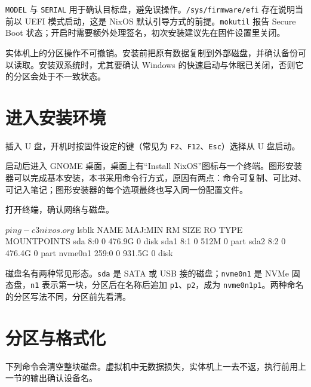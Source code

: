 \texttt{MODEL} 与 \texttt{SERIAL} 用于确认目标盘，避免误操作。\texttt{/sys/firmware/efi} 存在说明当前以 UEFI 模式启动，这是 NixOS 默认引导方式的前提。\texttt{mokutil} 报告 Secure Boot 状态；开启时需要额外处理签名，初次安装建议先在固件设置里关闭。

\begin{warnbox}[先备份再分区]
实体机上的分区操作不可撤销。安装前把原有数据复制到外部磁盘，并确认备份可以读取。安装双系统时，尤其要确认 Windows 的快速启动与休眠已关闭，否则它的分区会处于不一致状态。
\end{warnbox}

\section{进入安装环境}

插入 U 盘，开机时按固件设定的键（常见为 \texttt{F2}、\texttt{F12}、\texttt{Esc}）选择从 U 盘启动。

启动后进入 GNOME 桌面，桌面上有“Install NixOS”图标与一个终端。图形安装器可以完成基本安装，本书采用命令行方式，原因有两点：命令可复制、可比对、可记入笔记；图形安装器的每个选项最终也写入同一份配置文件。

打开终端，确认网络与磁盘。

\begin{shellsession}
$ ping -c 3 nixos.org
$ lsblk
NAME        MAJ:MIN RM   SIZE RO TYPE MOUNTPOINTS
sda           8:0    0 476.9G  0 disk
sda1          8:1    0   512M  0 part
sda2          8:2    0 476.4G  0 part
nvme0n1     259:0    0 931.5G  0 disk
\end{shellsession}

磁盘名有两种常见形态。\texttt{sda} 是 SATA 或 USB 接的磁盘；\texttt{nvme0n1} 是 NVMe 固态盘，\texttt{n1} 表示第一块，分区后在名称后追加 \texttt{p1}、\texttt{p2}，成为 \texttt{nvme0n1p1}。两种命名的分区写法不同，分区前先看清。

\section{分区与格式化}

下列命令会清空整块磁盘。虚拟机中无数据损失，实体机上一去不返，执行前用上一节的输出确认设备名。


